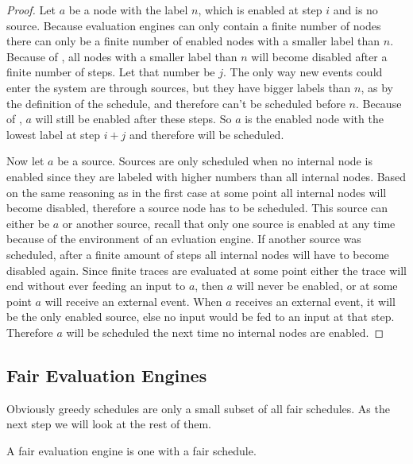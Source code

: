 \begin{proof}
  Let \(a\) be a node with the label \(n\), which is enabled at step \(i\) and is no source.
  Because evaluation engines can only contain a finite number of nodes there can only be a finite number of enabled nodes with a smaller label than \(n\).
  Because of , all nodes with a smaller label than \(n\) will become disabled after a finite number of steps.
  Let that number be \(j\).
  The only way new events could enter the system are through sources, but they have bigger labels than \(n\), as by the definition of the schedule, and therefore can't be scheduled before \(n\).
  Because of , \(a\) will still be enabled after these steps.
  So \(a\) is the enabled node with the lowest label at step \(i + j\) and therefore will be scheduled.

  Now let \(a\) be a source.
  Sources are only scheduled when no internal node is enabled since they are labeled with higher numbers than all internal nodes.
  Based on the same reasoning as in the first case at some point all internal nodes will become disabled, therefore a source node has to be scheduled.
  This source can either be \(a\) or another source, recall that only one source is enabled at any time because of the environment of an evluation engine.
  If another source was scheduled, after a finite amount of steps all internal nodes will have to become disabled again.
  Since finite traces are evaluated at some point either the trace will end without ever feeding an input to \(a\), then \(a\) will never be enabled, or at some point \(a\) will receive an external event.
  When \(a\) receives an external event, it will be the only enabled source, else no input would be fed to an input at that step.
  Therefore \(a\) will be scheduled the next time no internal nodes are enabled.
\end{proof}


\subsection{Fair Evaluation Engines}
\label{sec:behaviours:behaviour_without_timing:fair}

Obviously greedy schedules are only a small subset of all fair schedules.
As the next step we will look at the rest of them.

\begin{definition}[name = Fair Evaluation Engines]\label{def:fair_evaluation_engines}
  A fair evaluation engine is one with a fair schedule.
\end{definition}

